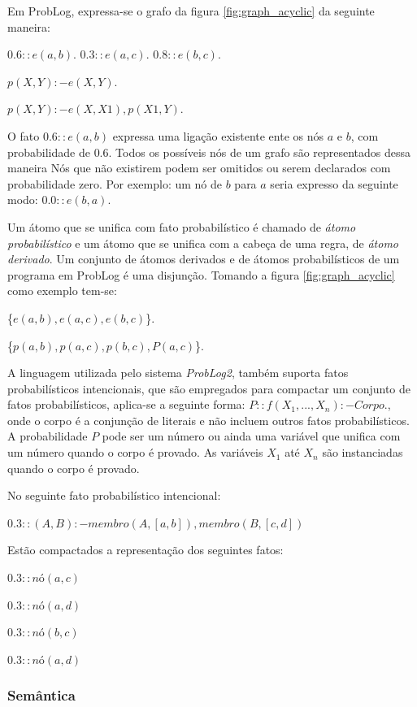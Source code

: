 \documentclass[
	12pt,				%
    oneside,			%
	a4paper,			%
	english,			%
	french,				%
	spanish,			%
	brazil,				%
	]{abntex2}
\begin{document}
Em ProbLog, expressa-se o grafo da figura \ref{fig:graph_acyclic} da seguinte maneira:

$0.6::e(a, b).  $ $0.3::e(a, c).  $ $0.8::e(b, c).$ \newline

$p(X, Y) :- e(X, Y). $ \newline

$p(X, Y) :- e(X, X1), p(X1, Y). $ \newline

O fato $0.6::e(a, b)$ expressa uma ligação existente ente os nós $a$ e $b$, com probabilidade de $0.6$. Todos os possíveis nós de um grafo são representados dessa maneira Nós que não existirem podem ser omitidos ou serem declarados com probabilidade zero. Por exemplo: um nó de $b$ para $a$ seria expresso da seguinte modo: $0.0::e(b, a)$.

Um átomo que se unifica com fato probabilístico é chamado de \textit{átomo probabilístico} e um átomo que se unifica com a cabeça de uma regra, de \textit{átomo derivado}. Um conjunto de átomos derivados e de átomos probabilísticos de um programa em ProbLog é uma disjunção. Tomando a figura \ref{fig:graph_acyclic} como exemplo tem-se:

\{$e(a, b), e(a, c), e(b, c)$\}.\newline

\{$p(a, b), p(a, c), p(b, c), P(a, c)$\}.\newline

A linguagem utilizada pelo sistema \textit{ProbLog2}, também suporta fatos probabilísticos intencionais, que são empregados para compactar um conjunto de fatos probabilísticos, aplica-se a seguinte forma: $P :: f(X_1,...,X_n):- Corpo.$, onde o corpo é a conjunção de literais e não incluem outros fatos probabilísticos. A probabilidade $P$ pode ser um número ou ainda uma variável que unifica com um número quando o corpo é provado. As variáveis $X_1$ até $X_n$ são instanciadas quando o corpo é provado.

No seguinte fato probabilístico intencional:

$0.3::(A, B) :- membro(A, [a, b]), membro(B, [c,d])$

Estão compactados a representação dos seguintes fatos:

$0.3::nó(a, c)$

$0.3::nó(a, d)$

$0.3::nó(b, c)$

$0.3::nó(a, d)$


\subsubsection{Semântica}
\end{document}
